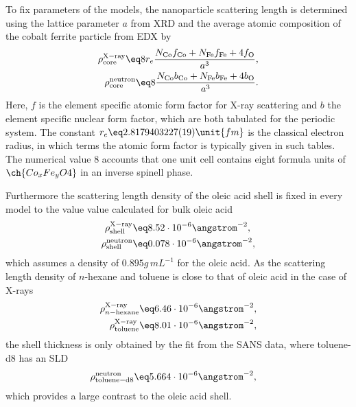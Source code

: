 \documentclass[\main/dresen_thesis.tex]{subfiles}
\begin{document}
    To fix parameters of the models, the nanoparticle scattering length is determined using the lattice parameter $a$ from XRD and the average atomic composition of the cobalt ferrite particle from EDX by
    \begin{align}
      \rho^\mathrm{X-ray}_\mathrm{core} \eq 8 r_e \frac{N_\mathrm{Co} f_\mathrm{Co} + N_\mathrm{Fe} f_\mathrm{Fe} + 4 f_\mathrm{O}}{a^3},\\
      \rho^\mathrm{neutron}_\mathrm{core} \eq 8 \frac{N_\mathrm{Co} b_\mathrm{Co} + N_\mathrm{Fe} b_\mathrm{Fe} + 4 b_\mathrm{O}}{a^3}.
    \end{align}
    Here, $f$ is the element specific atomic form factor for X-ray scattering and $b$ the element specific nuclear form factor, which are both tabulated for the periodic system.
    The constant $r_e \eq 2.8179403227(19) \unit{fm}$ is the classical electron radius, in which terms the atomic form factor is typically given in such tables.
    The numerical value $8$ accounts that one unit cell contains eight formula units of $\ch{Co_xFe_yO4}$ in an inverse spinell phase.

    Furthermore the scattering length density of the oleic acid shell is fixed in every model to the value value calculated for bulk oleic acid
    \begin{align}
      \rho^\mathrm{X-ray}_\mathrm{shell} &\eq 8.52 \cdot 10^{-6} \angstrom^{-2},\\
      \rho^\mathrm{neutron}_\mathrm{shell} &\eq 0.078 \cdot 10^{-6} \angstrom^{-2},
    \end{align}
    which assumes a density of $0.895 \unit{g\,mL^{-1}}$ for the oleic acid.
    As the scattering length density of $\mathit{n}$-hexane and toluene is close to that of oleic acid in the case of X-rays
    \begin{align}
      \rho^\mathrm{X-ray}_{n\mathrm{-hexane}} &\eq 6.46 \cdot 10^{-6} \angstrom^{-2},\\
      \rho^\mathrm{X-ray}_\mathrm{toluene} &\eq 8.01 \cdot 10^{-6} \angstrom^{-2},
    \end{align}
    the shell thickness is only obtained by the fit from the SANS data, where toluene-d8 has an SLD
    \begin{align}
      \rho^\mathrm{neutron}_\mathrm{toluene-d8} &\eq 5.664 \cdot 10^{-6} \angstrom^{-2},
    \end{align}
    which provides a large contrast to the oleic acid shell.
\end{document}
